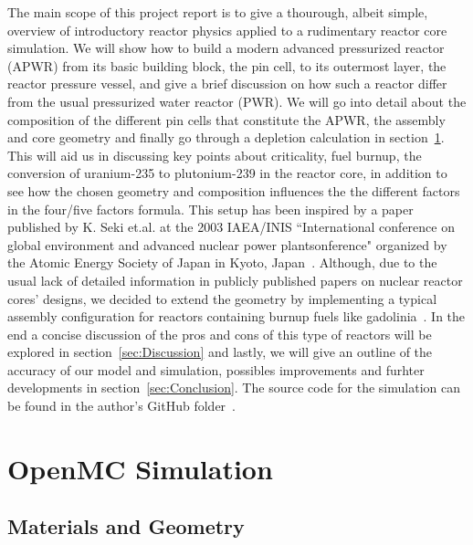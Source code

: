 \documentclass[twocolumn,a4paper,10pt]{article}
\begin{document}
The main scope of this project report is to give a thourough, albeit simple, overview of introductory reactor physics applied to a rudimentary reactor core simulation. We will show how to build a modern advanced pressurized reactor (APWR) from its basic building block, the pin cell, to its outermost layer, the reactor pressure vessel, and give a brief discussion on how such a reactor differ from the usual pressurized water reactor (PWR). We will go into detail about the composition of the different pin cells that constitute the APWR, the assembly and core geometry and finally go through a depletion calculation in section~\ref{sec:Simulation}. This will aid us in discussing key points about criticality, fuel burnup, the conversion of uranium-235 to plutonium-239 in the reactor core, in addition to see how the chosen geometry and composition influences the the different factors in the four/five factors formula. This setup has been inspired by a paper published by K. Seki et.al. at the 2003 IAEA/INIS ``International conference on global environment and advanced nuclear power plantsonference" organized by the Atomic Energy Society of Japan in Kyoto, Japan~\cite{APWR}. Although, due to the usual lack of detailed information in publicly published papers on nuclear reactor cores' designs, we decided to extend the geometry by implementing a typical assembly configuration for reactors containing burnup fuels like gadolinia~\cite{BurnupFuel}. In the end a concise discussion of the pros and cons of this type of reactors will be explored in section~\ref{sec:Discussion} and lastly, we will give an outline of the accuracy of our model and simulation, possibles improvements and furhter developments in section~\ref{sec:Conclusion}. The source code for the simulation can be found in the author's GitHub folder~\cite{GitHub}.


\section{OpenMC Simulation}
\label{sec:Simulation}

\subsection{Materials and Geometry}
\end{document}
